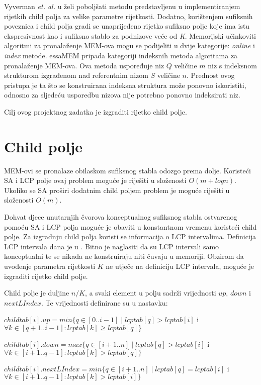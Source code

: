 \documentclass[times, utf8, seminar, numeric]{fer}
\begin{document}
Vyverman \textit{et. al.} u \cite{essa} želi poboljšati metodu predstavljenu u \cite{ssa} implementiranjem rijetkih child polja za velike parametre rijetkosti. Dodatno, korištenjem sufiksnih poveznica  i child polja gradi se unaprijeđeno rijetko sufiksno polje  koje ima istu ekspresivnost kao i sufiksno stablo za podnizove veće od \textit{K}. Memorijski učinkoviti algoritmi za pronalaženje MEM-ova mogu se podijeliti u dvije kategorije: \textit{online} i \textit{index} metode. essaMEM pripada kategoriji indeksnih metoda algoritama za pronalaženje MEM-ova. Ova metoda uspoređuje niz $Q$ veličine $m$ niz s indeksnom strukturom izgrađenom nad referentnim nizom $S$ veličine $n$. Prednost ovog pristupa je ta što se konstruirana indeksna struktura može ponovno iskoristiti, odnosno za sljedeću usporedbu nizova nije potrebno ponovno indeksirati niz. 

Cilj ovog projektnog zadatka je izgraditi rijetko child polje.

\chapter{Child polje}
MEM-ovi se pronalaze obilaskom sufiksnog stabla odozgo prema dolje. Koristeći SA i LCP polje ovaj problem moguće je riješiti u složenosti $O(m + log n)$. Ukoliko se SA proširi dodatnim child poljem problem je moguće riješiti u složenosti $O(m)$.

Dohvat djece unutarnjih čvorova konceptualnog sufiksnog stabla ostvarenog pomoću SA i LCP polja moguće je obaviti u konstantnom vremenu koristeći child polje. Za izgradnju child polja koristi se informacija o LCP intervalima. Definicija LCP intervala dana je u \citep{esa}. Bitno je naglasiti da su LCP intervali samo konceptualni te se nikada ne konstruiraju niti čuvaju u memoriji. Obzirom da uvođenje parametra rijetkosti $K$ ne utječe na definiciju LCP intervala, moguće je izgraditi rijetko child polje.

Child polje je duljine $n / K$, a svaki element u polju sadrži vrijednosti $up$, $down$ i $nextLIndex$. Te vrijednosti definirane su u nastavku:

$childtab[i].up = min\{q \in [0..i-1] \mid lcptab[q] > lcptab[i]$ i $\forall k \in [q+1..i-1] : lcptab[k] \geq lcptab[q]\}$

$childtab[i].down = max\{q \in [i+1..n] \mid lcptab[q] > lcptab[i]$ i $\forall k \in [i+1..q-1] : lcptab[k] > lcptab[q]\}$

$childtab[i].nextLIndex = min\{q \in [i+1..n] \mid lcptab[q] = lcptab[i]$ i $\forall k \in [i+1..q-1] : lcptab[k] > lcptab[i]\}$
\end{document}
